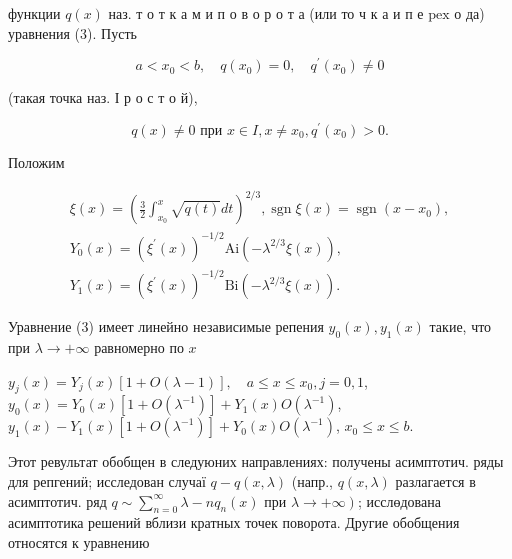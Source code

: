 \documentclass[10pt]{article}
\begin{document}
функции $q(x)$ наз. т о т к а м и п о в о р о т а (или то ч к а и п е $\mathrm{p} \mathrm{e} \mathrm{x}$ о да) уравнения (3). Пусть



\[

a<x_{0}<b, \quad q\left(x_{0}\right)=0, \quad q^{\prime}\left(x_{0}\right) \neq 0

\]



(такая точка наз. І р о с т о й),



\[

q(x) \neq 0 \text { при } x \in I, x \neq x_{0}, q^{\prime}\left(x_{0}\right)>0 .

\]



Положим



\[

\begin{gathered}

\xi(x)=\left(\frac{3}{2} \int_{x_{0}}^{x} \sqrt{q(t)} d t\right)^{2 / 3}, \operatorname{sgn} \xi(x)=\operatorname{sgn}\left(x-x_{0}\right), \\

Y_{0}(x)=\left(\xi^{\prime}(x)\right)^{-1 / 2} \mathrm{Ai}\left(-\lambda^{2 / 3} \xi(x)\right), \\

Y_{1}(x)=\left(\xi^{\prime}(x)\right)^{-1 / 2} \mathrm{Bi}\left(-\lambda^{2 / 3} \xi(x)\right) .

\end{gathered}

\]



Уравнение (3) имеет линейно независимые репения $y_{0}(x), y_{1}(x)$ такие, что при $\lambda \rightarrow+\infty$ равномерно по $x$



$y_{j}(x)=Y_{j}(x)[1+O(\lambda-1)], \quad a \leqslant x \leqslant x_{0}, j=0,1$, $y_{0}(x)=Y_{0}(x)\left[1+O\left(\lambda^{-1}\right)\right]+Y_{1}(x) O\left(\lambda^{-1}\right)$, $y_{1}(x)-Y_{1}(x)\left[1+O\left(\lambda^{-1}\right)\right]+Y_{0}(x) O\left(\lambda^{-1}\right)$, $x_{0} \leqslant x \leqslant b$.



Этот ревультат обобщен в следуюних направлениях: получены асимптотич. ряды для репгениӥ; исследован случаї $q-q(x, \lambda)$ (напр., $q(x, \lambda)$ разлагается в асимптотич. ряд $q \sim \sum_{n=0}^{\infty} \lambda-n q_{n}(x)$ при $\left.\lambda \rightarrow+\infty\right)$; исслөдована асимптотика решений вблизи кратных точек поворота. Другие обобщения относятся к уравнению
\end{document}
